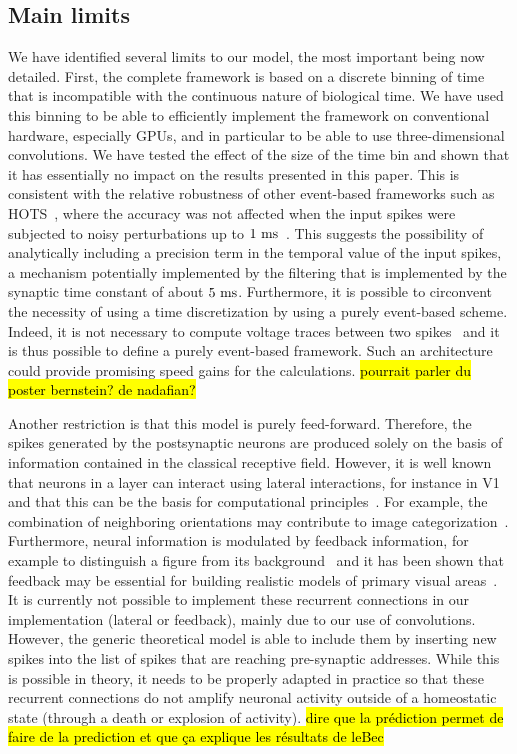 \documentclass[default]{sn-jnl}%
\theoremstyle{thmstyleone}%
\theoremstyle{thmstyletwo}%
\theoremstyle{thmstylethree}%
\newcommand{\note}[1]{{\sethlcolor{yellow}\hl{#1}}}
\begin{document}
\subsection{Main limits}
We have identified several limits to our model, the most important being now detailed. First, the complete framework is based on a discrete binning of time that is incompatible with the continuous nature of biological time. We have used this binning to be able to efficiently implement the framework on conventional hardware, especially GPUs, and in particular to be able to use three-dimensional convolutions. We have tested the effect of the size of the time bin and shown that it has essentially no impact on the results presented in this paper. This is consistent with the relative robustness of other event-based frameworks such as HOTS~\citep{lagorce_hots_2017}, where the accuracy was not affected when the input spikes were subjected to noisy perturbations up to $1~\si{\milli\second}$~\citep{grimaldi_robust_2022}. This suggests the possibility of analytically including a precision term in the temporal value of the input spikes, a mechanism potentially implemented by the filtering that is implemented by the synaptic time constant of about $5~\si{\milli\second}$. Furthermore, it is possible to circonvent the necessity of using a time discretization by using a purely event-based scheme. Indeed, it is not necessary to compute voltage traces between two spikes~\citep{hanuschkin_general_2010} and it is thus possible to define a purely event-based framework. Such an architecture could provide promising speed gains for the calculations.  \note{pourrait parler du poster bernstein? de nadafian?}

Another restriction is that this model is purely feed-forward. Therefore, the spikes generated by the postsynaptic neurons are produced solely on the basis of information contained in the classical receptive field. However, it is well known that neurons in a layer can interact using lateral interactions, for instance in V1 and that this can be the basis for computational principles~\citep{chavane_revisiting_2022}. For example, the combination of neighboring orientations may contribute to image categorization~\citep{perrinet_edge_2015}. Furthermore, neural information is modulated by feedback information, for example to distinguish a figure from its background~\citep{roelfsema_early_2016} and it has been shown that feedback may be essential for building realistic models of primary visual areas~\citep{boutin_sparse_2020, boutin_effect_2020, boutin_pooling_2022}. It is currently not possible to implement these recurrent connections in our implementation (lateral or feedback), mainly due to our use of convolutions. However, the generic theoretical model is able to include them by inserting new spikes into the list of spikes that are reaching pre-synaptic addresses. While this is possible in theory, it needs to be properly adapted in practice so that these recurrent connections do not amplify neuronal activity outside of a homeostatic state (through a death or explosion of activity).  
\note{ dire que la prédiction permet de faire de la prediction et que ça explique les résultats de leBec}~\citep{perrinet_motion-based_2012}
\end{document}
